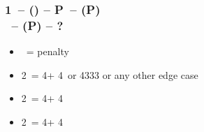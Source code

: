 \documentclass[12pt, a4paper]{article}
\begin{document}
\subsubsection*{1\nt\ -- (\dbl) -- P\alrts\ -- (P)\\
                \rdbl\ -- (P) -- ?}
\begin{itemize}
    \item \pass\ = penalty
    \item 2\clubs\ = 4\clubs + 4\ or 4333 or any other edge case
    \item 2\diams\ = 4\diams + 4\major
    \item 2\hearts\ = 4\hearts + 4\spades
\end{itemize}

\end{document}

